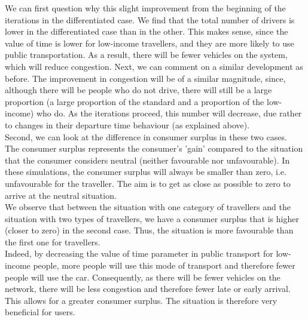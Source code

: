 \documentclass[a4paper, 12pt,oneside]{article}
\begin{document}

We can first question why this slight improvement from the beginning of the iterations in the differentiated case. We find that the total number of drivers is lower in the differentiated case than in the other. This makes sense, since the value of time is lower for low-income travellers, and they are more likely to use public transportation. As a result, there will be fewer vehicles on the system, which will reduce congestion. Next, we can comment on a similar development as before. The improvement in congestion will be of a similar magnitude, since, although there will be people who do not drive, there will still be a large proportion (a large proportion of the standard and a proportion of the low-income) who do. As the iterations proceed, this number will decrease, due rather to changes in their departure time behaviour (as explained above).\\

Second, we can look at the difference in consumer surplus in these two cases.\\

The consumer surplus represents the consumer's 'gain' compared to the situation that the consumer considers neutral (neither favourable nor unfavourable). In these simulations, the consumer surplus will always be smaller than zero, i.e. unfavourable for the traveller. The aim is to get as close as possible to zero to arrive at the neutral situation.\\

We observe that between the situation with one category of travellers and the situation with two types of travellers, we have a consumer surplus that is higher (closer to zero) in the second case. Thus, the situation is more favourable than the first one for travellers.\\

Indeed, by decreasing the value of time parameter in public transport for low-income people, more people will use this mode of transport and therefore fewer people will use the car. Consequently, as there will be fewer vehicles on the network, there will be less congestion and therefore fewer late or early arrival. This allows for a greater consumer surplus. The situation is therefore very beneficial for users.\\
\end{document}
